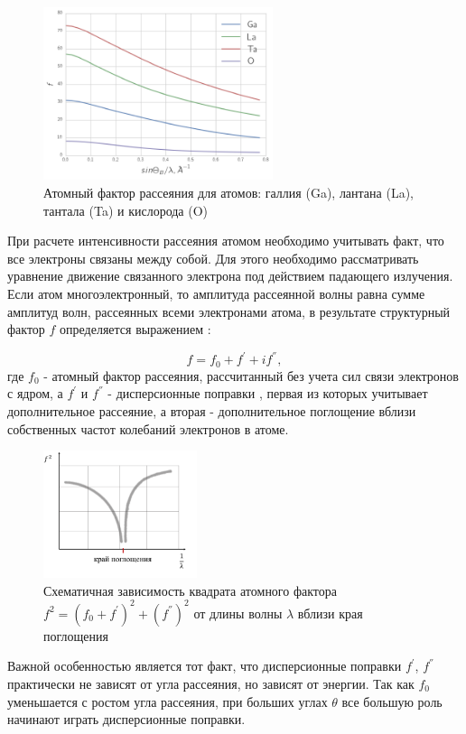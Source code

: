 \begin{figure}[H]
  \centering
  \includegraphics[width=0.6\textwidth]{images/atom_factor_GaLaTa.png}
  \caption{ Атомный фактор рассеяния для атомов: галлия (Ga), лантана (La), тантала (Ta) и  кислорода (O)}
  \label{ris:atom_factor_GaLaTa}
\end{figure}

При расчете интенсивности рассеяния атомом необходимо учитывать факт,
что все электроны связаны между собой. Для этого необходимо рассматривать
уравнение движение связанного электрона под действием падающего излучения.
Если атом многоэлектронный, то амплитуда рассеянной волны равна сумме амплитуд волн,
рассеянных всеми электронами атома, в результате структурный фактор $f$
определяется выражением \cite{iveronova1972}:

\begin{equation}
  f = f_0 + f^{'} + i f^{''},
 \end{equation}
\noindent
где $f_0$ - атомный фактор рассеяния, рассчитанный без учета сил связи электронов
 с ядром, а $f^{'}$ и $f^{''}$ - дисперсионные поправки \cite{f0f1f12},
 первая из которых учитывает дополнительное рассеяние,
а вторая - дополнительное поглощение вблизи собственных частот колебаний электронов в атоме.

 \begin{figure}[H]
   \centering
   \includegraphics[width=0.4\textwidth]{images/dispers_f.png}
   \caption{ Схематичная зависимость квадрата атомного фактора $f^2 = (f_0 + f^{'})^2 + (f^{''})^2 $ от
   длины волны $\lambda$ вблизи края поглощения}
   \label{ris:dispers_f}
 \end{figure}

Важной особенностью является тот факт, что дисперсионные поправки $f^{'}$, $f^{''}$
практически не зависят от угла рассеяния, но зависят от энергии. Так как $f_0$ уменьшается
с ростом угла рассеяния, при больших углах $\theta$ все большую роль начинают играть дисперсионные поправки.
